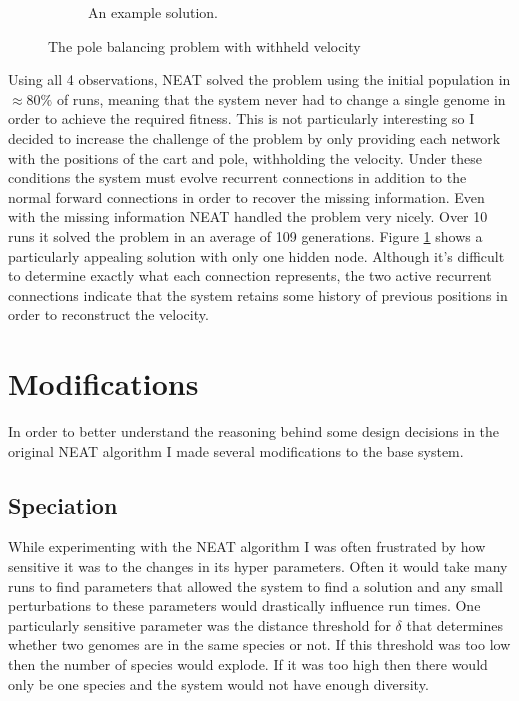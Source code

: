 \documentclass[twocolumn,letterpaper]{article}
\begin{document}
\begin{figure}[h]
\begin{subfigure}[b]{0.3\textwidth}
		\caption{An example solution.}
		\label{fig:cart_solution}
	\end{subfigure}
	\caption{The pole balancing problem with withheld velocity}
	\label{fig:cartpole}
\end{figure}

Using all 4 observations, NEAT solved the problem using the initial population in $\approx80\%$ of runs, meaning
that the system never had to change a single genome in order to achieve the required fitness. This is not
particularly interesting so I decided to increase the challenge of the problem by only providing each network
with the positions of the cart and pole, withholding the velocity. Under these conditions the system must
evolve recurrent connections in addition to the normal forward connections in order to recover the missing
information. Even with the missing information NEAT handled the problem very nicely. Over 10 runs it solved
the problem in an average of 109 generations. Figure \ref{fig:cart_solution} shows a particularly
appealing solution with only one hidden node. Although it's difficult to determine exactly what each 
connection represents, the two active recurrent connections indicate that the system retains some history
of previous positions in order to reconstruct the velocity.  

\section{Modifications} \label{sec:mods}
In order to better understand the reasoning behind some design decisions in the original NEAT algorithm I made
several modifications to the base system.

\subsection{Speciation} \label{sec:speciation}
While experimenting with the NEAT algorithm I was often frustrated by how sensitive it was to the changes
in its hyper parameters. Often it would take many runs to find parameters that allowed the system to find a
solution and any small perturbations to these parameters would drastically influence run times. One 
particularly sensitive parameter was the distance threshold for $\delta$ that determines whether two genomes
are in the same species or not. If this threshold was too low then the number of species would explode. If
it was too high then there would only be one species and the system would not have enough diversity.
\end{document}
